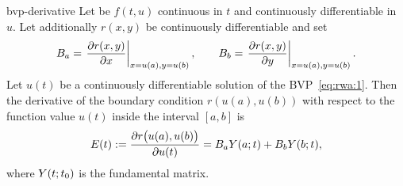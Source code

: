 \begin{Lemma}{bvp-derivative}
  Let be $f(t,u)$ continuous in $t$ and continuously differentiable in
  $u$.  Let additionally $r(x,y)$ be continuously differentiable and
  set
  \begin{gather}
    \label{eq:rwa:9}
    B_a = \left.\frac{\partial r(x,y)}{\partial
        x}\right|_{x=u(a),y=u(b)},
    \qquad
    B_b = \left.\frac{\partial r(x,y)}{\partial
        y}\right|_{x=u(a),y=u(b)}.
  \end{gather}
  Let $u(t)$ be a continuously differentiable solution of the
  BVP~\eqref{eq:rwa:1}.  Then the derivative of the boundary condition
  $r(u(a),u(b))$ with respect to the function value $u(t)$ inside the
  interval $[a,b]$ is
  \begin{gather}
    \label{eq:rwa:12}
    E(t)
    := \frac{\partial r\bigl(u(a),u(b)\bigr)}{\partial u(t)}
    = \rwaa \fundamental(a;t) + \rwab \fundamental(b;t),
  \end{gather}
  where $\fundamental(t;t_0)$ is the fundamental matrix.
\end{Lemma}
